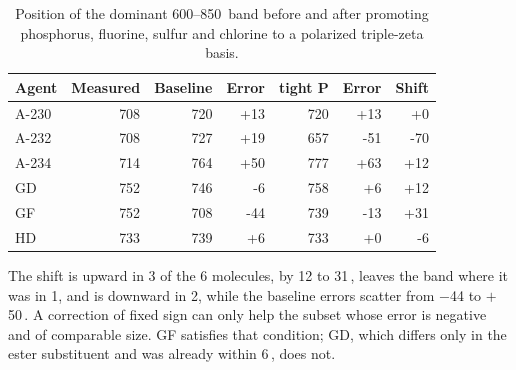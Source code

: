 \begin{table}[htbp]
\centering
\caption{Position of the dominant 600--850\,\wn{} band before and after promoting phosphorus, fluorine, sulfur and chlorine to a polarized triple-zeta basis.}
\label{tab:si-bandshift}
\small
\begin{tabular}{lrrrrrr}
\toprule
Agent & Measured & Baseline & Error & tight P & Error & Shift \\
\midrule
A-230 & 708 & 720 & +13 & 720 & +13 & +0 \\
A-232 & 708 & 727 & +19 & 657 & -51 & -70 \\
A-234 & 714 & 764 & +50 & 777 & +63 & +12 \\
GD & 752 & 746 & -6 & 758 & +6 & +12 \\
GF & 752 & 708 & -44 & 739 & -13 & +31 \\
HD & 733 & 739 & +6 & 733 & +0 & -6 \\
\bottomrule
\end{tabular}

\begin{flushleft}\footnotesize The shift is upward in 3 of the 6 molecules, by 12 to 31\,\wn{}, leaves the band where it was in 1, and is downward in 2, while the baseline errors scatter from $-$44 to $+$50\,\wn{}. A correction of fixed sign can only help the subset whose error is negative and of comparable size. GF satisfies that condition; GD, which differs only in the ester substituent and was already within 6\,\wn{}, does not.\end{flushleft}
\end{table}
